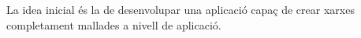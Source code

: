 La idea inicial és la de desenvolupar una aplicació capaç de crear xarxes completament mallades a nivell de aplicació. 
